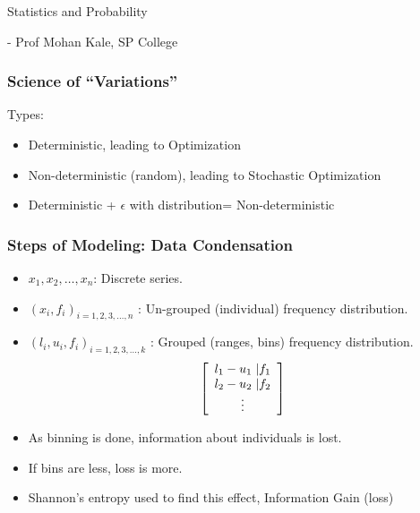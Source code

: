 \begin{frame}[fragile]\frametitle{}
\begin{center}
{\Large Statistics and Probability}

 - Prof Mohan Kale, SP College
\end{center}
\end{frame}

\begin{frame}[fragile]\frametitle{Science of ``Variations''}
Types:
\begin{itemize}
\item Deterministic, leading to Optimization
\item Non-deterministic (random), leading to Stochastic Optimization
\item Deterministic + $\epsilon$ with distribution= Non-deterministic
\end{itemize}
\end{frame}



\begin{frame}[fragile]\frametitle{Steps of Modeling: Data Condensation}

\begin{itemize}
\item $x_1,x_2,\ldots,x_n$: Discrete series.
\item $(x_i,f_i)_{i=1,2,3,\ldots,n}$ : Un-grouped (individual) frequency distribution.
\item $(l_i,u_i,f_i)_{i=1,2,3,\ldots,k}$ : Grouped (ranges, bins) frequency distribution.
$$ \left[ \begin{array}{cc}
						 l_1 - u_1 \hspace{1mm}  |f_1\\
 						 l_2 - u_2 \hspace{1mm}  |f_2\\
 						 \vdots
                              \end{array}  \right]   $$
\item As binning is done, information about individuals is lost.
\item If bins are less, loss is more.
\item Shannon's entropy used to find this effect, Information Gain (loss)
\end{itemize}
\end{frame}

